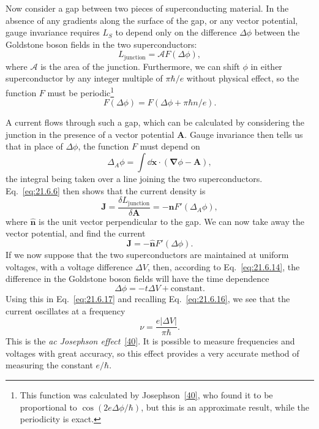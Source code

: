 Now consider a gap between two pieces of superconducting material. In the absence of any gradients along the surface of the gap, or any vector potential, gauge invariance requires $L_S$ to depend only on the difference $\Delta\phi$ between the Goldstone boson fields in the two superconductors:
\begin{equation}
L_{\mathrm{junction}}=\mathcal A F(\Delta\phi),
\tag{21.6.15}\label{eq:21.6.15}
\end{equation}
where $\mathcal A$ is the area of the junction. Furthermore, we can shift $\phi$ in either superconductor by any integer multiple of $\pi\hbar/e$ without physical effect, so the function $F$ must be periodic\footnote{This function was calculated by Josephson~\hyperref[ch21-ref-40]{[40]}, who found it to be proportional to $\cos(2e\Delta\phi/\hbar)$, but this is an approximate result, while the periodicity is exact.}
\begin{equation}
F(\Delta\phi)=F(\Delta\phi+\pi\hbar n/e).
\tag{21.6.16}\label{eq:21.6.16}
\end{equation}

A current flows through such a gap, which can be calculated by considering the junction in the presence of a vector potential $\mathbf A$. Gauge invariance then tells us that in place of $\Delta\phi$, the function $F$ must depend on
\[
\Delta_A\phi=\int \dd\mathbf x\cdot
\left(\boldsymbol\nabla\phi-\mathbf A\right),
\]
the integral being taken over a line joining the two superconductors. Eq.~\eqref{eq:21.6.6} then shows that the current density is
\[
\mathbf J=\frac{\delta L_{\mathrm{junction}}}{\delta\mathbf A}
=-\widehat{\mathbf n}F'(\Delta_A\phi),
\]
where $\widehat{\mathbf n}$ is the unit vector perpendicular to the gap. We can now take away the vector potential, and find the current
\begin{equation}
\mathbf J=-\widehat{\mathbf n}F'(\Delta\phi).
\tag{21.6.17}\label{eq:21.6.17}
\end{equation}
If we now suppose that the two superconductors are maintained at uniform voltages, with a voltage difference $\Delta V$, then, according to Eq.~\eqref{eq:21.6.14}, the difference in the Goldstone boson fields will have the time dependence
\begin{equation}
\Delta\phi=-t\Delta V+\text{constant}.
\tag{21.6.18}\label{eq:21.6.18}
\end{equation}
Using this in Eq.~\eqref{eq:21.6.17} and recalling Eq.~\eqref{eq:21.6.16}, we see that the current oscillates at a frequency
\begin{equation}
\nu=\frac{e|\Delta V|}{\pi\hbar}.
\tag{21.6.19}\label{eq:21.6.19}
\end{equation}
This is the \emph{ac Josephson effect}~\hyperref[ch21-ref-40]{[40]}. It is possible to measure frequencies and voltages with great accuracy, so this effect provides a very accurate method of measuring the constant $e/\hbar$.

